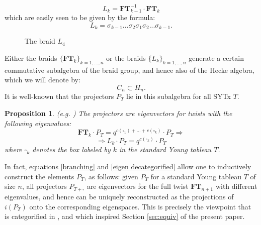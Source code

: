 \documentclass[12pt]{amsart}
\numberwithin{equation}{section}
\newtheorem{proposition}[theorem]{Proposition}
\theoremstyle{definition}
\theoremstyle{remark}
\newcommand{\FT}{\mathbf{FT}}
\renewcommand{\1}{\mathbf{1}}
\newcommand{\sq}{\square}
\begin{document}
$$
L_k = \FT_{k-1}^{-1} \cdot \FT_k
$$
which are easily seen to be given by the formula:
$$
L_k = \sigma_{k-1}... \sigma_2 \sigma_1 \sigma_2 ... \sigma_{k-1} .
$$
\begin{figure}[ht!]
\label{fig: murphy}
\caption{The braid $L_4$}
\end{figure}
Either the braids $\{\FT_k\}_{k=1,\ldots, n}$  or the braids $\{L_k\}_{k = 1, \ldots, n}$ generate a certain commutative subalgebra of the braid group, and hence also of the Hecke algebra, which we will denote by:
$$
C_n \subset H_n.
$$
It is well-known that the projectors $P_T$ lie in this subalgebra for all SYTx $T$. 

\begin{proposition}(e.g. \cite[Theorem 5.5]{AiMor}) The projectors are eigenvectors for twists with the following eigenvalues: 
\begin{equation}
\label{eigen decategorified}
\FT_k\cdot P_T =q^{c(\sq_1)+...+c(\sq_k)}  \cdot P_T \Longrightarrow
\end{equation}
\begin{equation}
\label{eigen decategorified 2}
\Longrightarrow L_k\cdot P_T = q^{c(\sq_k)}\cdot P_T
\end{equation}
where $\sq_k$ denotes the box labeled by $k$ in the standard Young tableau $T$. 
\end{proposition}

In fact, equations \eqref{branching} and \eqref{eigen decategorified} allow one to inductively construct the elements $P_T$, as follows: given $P_T$ for a standard Young tableau $T$ of size $n$, all projectors $P_{T+\sq}$ are eigenvectors for the full twist $\FT_{n+1}$ with different eigenvalues, and hence can be uniquely reconstructed as the projections of $i(P_T)$ onto the corresponding eigenspaces. This is precisely the viewpoint that is categorified in \cite{EH}, and which inspired Section \ref{sec:equiv} of the present paper.
\end{document}
